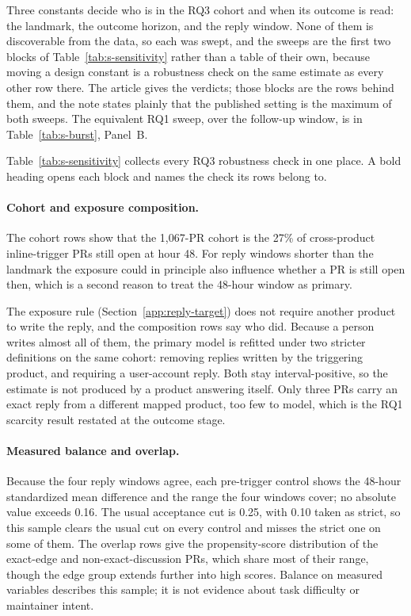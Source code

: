 \documentclass[pdflatex,sn-basic]{sn-jnl}
\begin{document}
Three constants decide who is in the RQ3 cohort and when its outcome is read:
the landmark, the outcome horizon, and the reply window. None of them is
discoverable from the data, so each was swept, and the sweeps are the first two
blocks of Table~\ref{tab:s-sensitivity} rather than a table of their own,
because moving a design constant is a robustness check on the same estimate as
every other row there. The article gives the verdicts; those blocks are the rows
behind them, and the note states plainly that the published setting is the
maximum of both sweeps. The equivalent RQ1 sweep, over the follow-up window, is
in Table~\ref{tab:s-burst}, Panel~B.

Table~\ref{tab:s-sensitivity} collects every RQ3 robustness check in one place.
A bold heading opens each block and names the check its rows belong to.

\paragraph{Cohort and exposure composition.} The cohort rows show that the
1,067-PR cohort is the 27\% of cross-product inline-trigger PRs still open at
hour 48. For reply windows shorter than the landmark the exposure could in
principle also influence whether a PR is still open then, which is a second
reason to treat the 48-hour window as primary.

The exposure rule (Section~\ref{app:reply-target}) does not require another
product to write the reply, and the composition rows say who did. Because a
person writes almost all of them, the primary model is refitted under two
stricter definitions on the same cohort: removing replies written by the
triggering product, and requiring a user-account reply. Both stay
interval-positive, so the estimate is not produced by a product answering
itself. Only three PRs carry an exact reply from a different mapped product, too
few to model, which is the RQ1 scarcity result restated at the outcome stage.

\paragraph{Measured balance and overlap.} Because the four reply windows agree,
each pre-trigger control shows the 48-hour standardized mean difference and the
range the four windows cover; no absolute value exceeds 0.16. The usual
acceptance cut is 0.25, with 0.10 taken as strict, so this sample clears the
usual cut on every control and misses the strict one on some of them. The overlap rows
give the propensity-score distribution of the exact-edge and
non-exact-discussion PRs, which share most of their range, though the edge group
extends further into high scores. Balance on measured variables describes this
sample; it is not evidence about task difficulty or maintainer intent.
\end{document}
